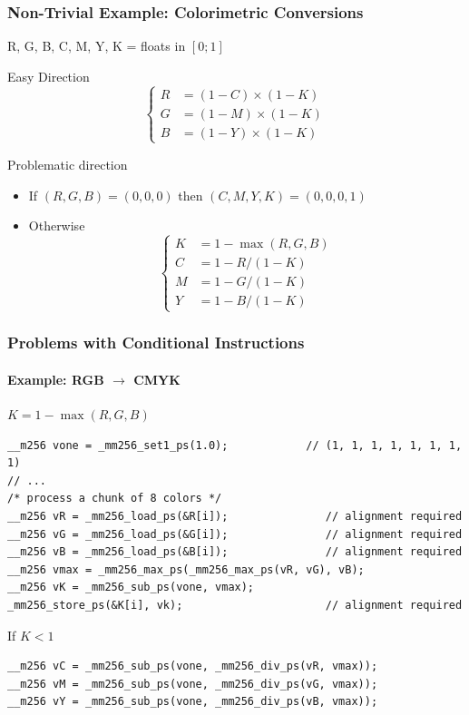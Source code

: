 \documentclass[xcolor={x11names,svgnames}]{beamer}
\begin{document}
\begin{frame}[fragile=singleslide]
  \frametitle{Non-Trivial Example: Colorimetric Conversions}

  R, G, B, C, M, Y, K = floats in $[0; 1]$

  \begin{exampleblock}{Easy Direction}
  \[
  \left\{
    \begin{array}{rl}
      R &= (1-C) \times (1 - K) \\
      G &= (1-M) \times (1 - K) \\
      B &= (1-Y) \times (1 - K)
    \end{array}
    \right.
\]
\end{exampleblock}

\begin{alertblock}{Problematic direction}
  \begin{itemize}
  \item If $(R, G, B) = (0, 0, 0)$ then $(C,M,Y,K) = (0, 0, 0, 1)$
    
  \item Otherwise
    \[  \left\{\begin{array}{rl}
      K &= 1 - \max(R, G, B) \\
      C &= 1 - R  / (1 - K) \\
      M &= 1 - G  / (1 - K) \\
      Y &= 1 - B  / (1 - K) 
    \end{array}
    \right.
\]
\end{itemize}


\end{alertblock}
\end{frame}


\begin{frame}[fragile=singleslide]
  \frametitle{Problems with Conditional Instructions}
  \framesubtitle{Example: RGB $\rightarrow$ CMYK}

  \begin{block}{$K = 1 - \max(R, G, B)$}
\begin{verbatim}
__m256 vone = _mm256_set1_ps(1.0);            // (1, 1, 1, 1, 1, 1, 1, 1)
// ...
/* process a chunk of 8 colors */
__m256 vR = _mm256_load_ps(&R[i]);               // alignment required
__m256 vG = _mm256_load_ps(&G[i]);               // alignment required
__m256 vB = _mm256_load_ps(&B[i]);               // alignment required
__m256 vmax = _mm256_max_ps(_mm256_max_ps(vR, vG), vB);
__m256 vK = _mm256_sub_ps(vone, vmax);
_mm256_store_ps(&K[i], vk);                      // alignment required
\end{verbatim}
\end{block}

  \begin{alertblock}{If $K < 1$}
\begin{verbatim}
__m256 vC = _mm256_sub_ps(vone, _mm256_div_ps(vR, vmax));
__m256 vM = _mm256_sub_ps(vone, _mm256_div_ps(vG, vmax));
__m256 vY = _mm256_sub_ps(vone, _mm256_div_ps(vB, vmax));
\end{verbatim}
  \end{alertblock}  
\end{frame}
\end{document}
